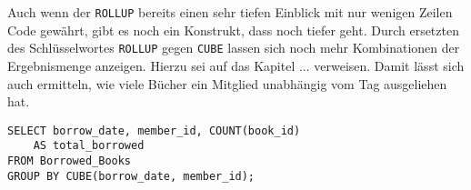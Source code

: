 Auch wenn der \texttt{ROLLUP} bereits einen sehr tiefen Einblick mit nur wenigen
Zeilen Code gewährt, gibt es noch ein Konstrukt, dass noch tiefer geht. Durch
ersetzten des Schlüsselwortes \texttt{ROLLUP} gegen \texttt{CUBE} lassen sich
noch mehr Kombinationen der Ergebnismenge anzeigen. Hierzu sei auf das Kapitel ...
verweisen. Damit lässt sich auch ermitteln, wie viele Bücher ein Mitglied unabhängig
vom Tag ausgeliehen hat.

\begin{lstlisting}
SELECT borrow_date, member_id, COUNT(book_id)
	AS total_borrowed
FROM Borrowed_Books
GROUP BY CUBE(borrow_date, member_id);
\end{lstlisting}